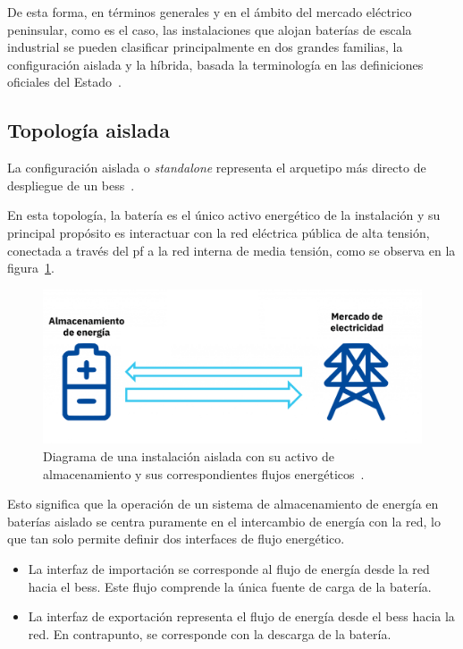 De esta forma, en términos generales y en el ámbito del mercado eléctrico peninsular, como es el caso, las instalaciones que alojan baterías de escala industrial se pueden clasificar principalmente en dos grandes familias, la configuración aislada y la híbrida, basada la terminología en las definiciones oficiales del Estado~\cite{cnmc2024servicios}.

\subsection{Topología aislada}
\label{makereference3.1.1}

La configuración aislada o \textit{standalone} representa el arquetipo más directo de despliegue de un \gls{bess}~\cite{gallo2023stand}.

En esta topología, la batería es el único activo energético de la instalación y su principal propósito es interactuar con la red eléctrica pública de alta tensión, conectada a través del \gls{pf} a la red interna de media tensión, como se observa en la figura~\ref{fig:topologia-aislada}.

\begin{figure}
  \centering
  \includegraphics[width=0.5\linewidth]{figures/topologia-aislada.png}
  \caption{Diagrama de una instalación aislada con su activo de almacenamiento y sus correspondientes flujos energéticos~\cite{aleasoft2025la}.}
  \label{fig:topologia-aislada}
\end{figure}

Esto significa que la operación de un sistema de almacenamiento de energía en baterías aislado se centra puramente en el intercambio de energía con la red, lo que tan solo permite definir dos interfaces de flujo energético.

\begin{itemize}

  \item La interfaz de importación se corresponde al flujo de energía desde la red hacia el \gls{bess}. Este flujo comprende la única fuente de carga de la batería.

  \item  La interfaz de exportación representa el flujo de energía desde el \gls{bess} hacia la red. En contrapunto, se corresponde con la descarga de la batería.

\end{itemize}

